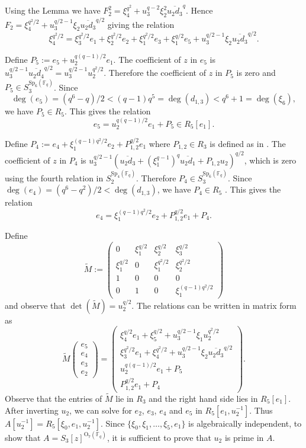 \documentclass{amsart}
\newcommand{\field}{\mathbb{F}}
\newcommand{\syp}[2]{{{\text{Sp}_{{#1}}(\field_{#2})}}}
\newcommand{\orth}[2]{{{\text{O}_{{#1}}(\field_{#2})}}}
\begin{document}
Using the Lemma we have $F_2^2=\xi_4^{q^2}+u_3^{q-2}\xi_2^2\overline{u_2d_3}^q$.
Hence $F_2=\xi_4^{q^2/2}+u_3^{q/2-1}\xi_2\overline{u_2d_3}^{q/2}$ giving the relation
\begin{equation}\label{O7-eqn2}
\xi_4^{q^2/2}=\xi_3^{q^2/2}e_1+\xi_2^{q^2/2}e_2+\xi_1^{q^2/2}e_3+\xi_1^{q/2}e_5+u_3^{q/2-1}\xi_2\overline{u_2d_3}^{q/2}.
\end{equation}

Define $P_5:=e_5+u_2^{q(q-1)/2}e_1$. The coefficient of $z$ in $e_5$ is $u_3^{q/2-1}\overline{u_2d_4}^{q/2}=u_3^{q/2-1}u_2^{q^2/2}$.
Therefore the coefficient of $z$ in $P_5$ is zero and $P_5\in S_3^{\syp{6}{q}}$. 
Since $$\deg(e_5)=(q^6-q)/2<(q-1)q^5=\deg(d_{1,3})<q^6+1=\deg(\xi_6),$$
we have $P_5\in R_5$. This gives the relation
\begin{equation}\label{O7-eqn3}
e_5=u_2^{q(q-1)/2}e_1+P_5\in R_5[e_1].
\end{equation}

Define $P_4:=e_4+\xi_1^{(q-1)q^2/2}e_2+P_{1,2}^{q/2}e_1$ where $P_{1,2}\in R_3$
is defined as in \cite[Prop. 8.3.7]{benson-polyinvafinigrou:93}.
The coefficient of $z$ in $P_4$ is $u_3^{q/2-1}(\overline{u_2d_3}+(\xi_1^{q-1})^q\overline{u_2d_1}+P_{1,2}u_2)^{q/2}$,
which is zero using the fourth relation in $S_2^{\syp{4}{q}}$. Therefore $P_4\in S_3^{\syp{6}{q}}$. 
Since $\deg(e_4)=(q^6-q^2)/2<\deg(d_{1,3})$, we have $P_4\in R_5$ . This gives the relation
\begin{equation}\label{O7-eqn4}
e_4=\xi_1^{(q-1)q^2/2}e_2+P_{1,2}^{q/2}e_1+P_4.
\end{equation}

Define
$$\widetilde{M}:=\begin{pmatrix}
0&\xi_1^{q/2}& \xi_2^{q/2} & \xi_3^{q/2}\\
\xi_1^{q/2}& 0& \xi_1^{q^2/2}&\xi_2^{q^2/2}\\
1&0&0&0\\
0&1&0& \xi_1^{(q-1)q^2/2}
\end{pmatrix}$$
and observe that $\det(\widetilde{M})=u_2^{q/2}$.
The relations can be written in matrix form as
$$\widetilde{M} \begin{pmatrix} e_5\\ e_4 \\ e_3 \\ e_2 \end{pmatrix} 
=\begin{pmatrix} \xi_4^{q/2}e_1+\xi_5^{q/2}+u_3^{q/2-1}\xi_1u_2^{q^2/2}\\ 
\xi_3^{q^2/2}e_1+\xi_4^{q^2/2}+u_3^{q/2-1}\xi_2\overline{u_2d_3}^{q/2} \\ 
u_2^{q(q-1)/2}e_1+P_5 \\
P_{1,2}^{q/2} e_1+P_4 \end{pmatrix} .$$
 Observe that the entries of $\widetilde{M}$ lie in $R_3$ and the right hand side lies in $R_5[e_1]$.
 After inverting $u_2$, we can solve for $e_2$, $e_3$, $e_4$ and $e_5$ in $R_5[e_1,u_2^{-1}]$.
 Thus $A[u_2^{-1}]=R_5[\xi_0,e_1,u_2^{-1}]$.
 Since $\{\xi_0,\xi_1,\ldots,\xi_5,e_1\}$ is algebraically independent, to show that $A=S_3[z]^{\orth{7}{q}}$,
 it is sufficient to prove that $u_2$ is prime in $A$.
\end{document}
